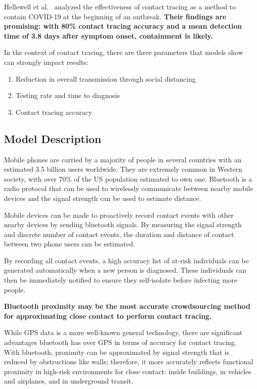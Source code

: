 \documentclass[11pt]{article}
\begin{document}
Hellewell et al.~\cite{lancet} analyzed the effectiveness of contact tracing as a method to contain COVID-19 at the beginning of an outbreak. \textbf{Their findings are promising: with 80\% contact tracing accuracy and a mean detection time of 3.8 days after symptom onset, containment is likely.}

In the context of contact tracing, there are three parameters that models show~\cite{Ferrettieabb6936} can strongly impact results:
\begin{enumerate}
\item Reduction in overall transmission through social distancing
\item Testing rate and time to diagnosis
\item Contact tracing accuracy
\end{enumerate}

\subsection{Model Description}

Mobile phones are carried by a majority of people in several countries with an estimated 3.5 billion users worldwide. They are extremely common in Western society, with over 70\% of the US population estimated to own one. Bluetooth is a radio protocol that can be used to wirelessly communicate between nearby mobile devices and the signal strength can be used to estimate distance.


Mobile devices can be made to proactively record contact events with other nearby devices by sending bluetooth signals. By measuring the signal strength and discrete number of contact events, the duration and distance of contact between two phone users can be estimated. 



By recording all contact events, a high accuracy list of at-risk individuals can be generated automatically when a new person is diagnosed. These individuals can then be immediately notified to ensure they self-isolate before infecting more people. 

\textbf{Bluetooth proximity may be the most accurate crowdsourcing method for approximating close contact to perform contact tracing.}


While GPS data is a more well-known general technology, there are significant advantages bluetooth has over GPS in terms of accuracy for contact tracing. With bluetooth, proximity can be approximated by signal strength that is reduced by obstructions like walls; therefore, it more accurately reflects functional proximity in high-risk environments for close contact: inside buildings, in vehicles and airplanes, and in underground transit.
\end{document}
